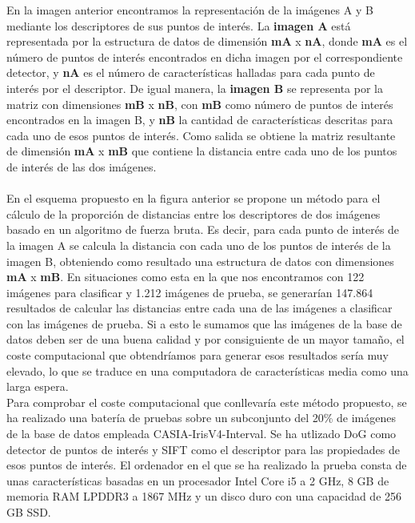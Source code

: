 En la imagen anterior encontramos la representación de la imágenes A y B mediante los descriptores de sus puntos de interés. La \textbf{imagen A} está representada por la estructura de datos de dimensión \textbf{mA} x \textbf{nA}, donde \textbf{mA} es el número de puntos de interés encontrados en dicha imagen por el correspondiente detector, y \textbf{nA} es el número de características halladas para cada punto de interés por el descriptor. De igual manera, la \textbf{imagen B} se representa por la matriz con dimensiones \textbf{mB} x \textbf{nB}, con \textbf{mB} como número de puntos de interés encontrados en la imagen B, y \textbf{nB} la cantidad de características descritas para cada uno de esos puntos de interés. Como salida se obtiene la matriz resultante de dimensión \textbf{mA} x \textbf{mB} que contiene la distancia entre cada uno de los puntos de interés de las dos imágenes.  \\ \\

En el esquema propuesto en la figura anterior se propone un método para el cálculo de la proporción de distancias entre los descriptores de dos imágenes basado en un algoritmo de fuerza bruta. Es decir, para cada punto de interés de la imagen A se calcula la distancia con cada uno de los puntos de interés de la imagen B, obteniendo como resultado una estructura de datos con dimensiones \textbf{mA} x \textbf{mB}. En situaciones como esta en la que nos encontramos con 122 imágenes para clasificar y 1.212 imágenes de prueba, se generarían 147.864 resultados de calcular las distancias entre cada una de las imágenes a clasificar con las imágenes de prueba. Si a esto le sumamos que las imágenes de la base de datos deben ser de una buena calidad y por consiguiente de un mayor tamaño,  el coste computacional que obtendríamos para generar esos resultados sería muy elevado, lo que se traduce en una computadora de características media como una larga espera. \\

Para comprobar el coste computacional que conllevaría este método propuesto, se ha realizado una batería de pruebas sobre un subconjunto del 20\% de imágenes de la base de datos empleada CASIA-IrisV4-Interval. Se ha utlizado DoG como detector de puntos de interés y SIFT como el descriptor para las propiedades de esos puntos de interés. El ordenador en el que se ha realizado la prueba consta de unas características basadas en un procesador Intel Core i5 a 2 GHz, 8 GB  de memoria RAM LPDDR3 a 1867 MHz y un disco duro con una capacidad de 256 GB SSD. \\

